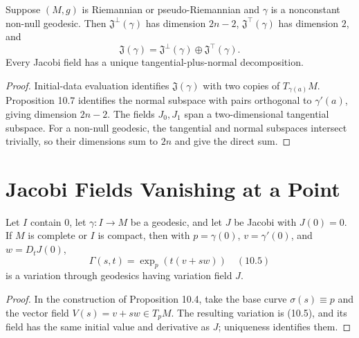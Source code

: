 \begin{corollary}
\label{cor:jacobi-field-decomposition}

Suppose $(M,g)$ is Riemannian or pseudo-Riemannian and $\gamma$ is a
nonconstant non-null geodesic.  Then
$\mathfrak J^\perp(\gamma)$ has dimension $2n-2$,
$\mathfrak J^\top(\gamma)$ has dimension $2$, and
\[
\mathfrak J(\gamma)=\mathfrak J^\perp(\gamma)\oplus\mathfrak J^\top(\gamma).
\]
Every Jacobi field has a unique tangential-plus-normal decomposition.
\end{corollary}

\begin{proof}
\sketch
Initial-data evaluation identifies $\mathfrak J(\gamma)$ with two copies of
$T_{\gamma(a)}M$.  Proposition 10.7 identifies the normal subspace with pairs
orthogonal to $\gamma'(a)$, giving dimension $2n-2$.  The fields $J_0,J_1$
span a two-dimensional tangential subspace.  For a non-null geodesic, the
tangential and normal subspaces intersect trivially, so their dimensions sum
to $2n$ and give the direct sum.
\end{proof}

\section{Jacobi Fields Vanishing at a Point}

\begin{lemma}
\label{lem:jacobi-field-variation}

Let $I$ contain $0$, let $\gamma:I\to M$ be a geodesic, and let $J$ be Jacobi
with $J(0)=0$.  If $M$ is complete or $I$ is compact, then with
$p=\gamma(0)$, $v=\gamma'(0)$, and $w=D_tJ(0)$,
\begin{equation}
\Gamma(s,t)=\exp_p(t(v+sw)) \quad (10.5)
\end{equation}
is a variation through geodesics having variation field $J$.
\end{lemma}

\begin{proof}
\sketch
In the construction of Proposition 10.4, take the base curve
$\sigma(s)\equiv p$ and the vector field $V(s)=v+sw\in T_pM$.  The resulting
variation is (10.5), and its field has the same initial value and derivative
as $J$; uniqueness identifies them.
\end{proof}

